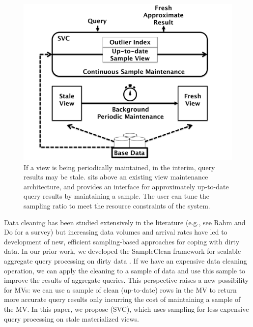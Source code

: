 \begin{figure}[t] \vspace{-2em}
\centering
 \includegraphics[scale=0.25]{figs/sys-arch.pdf} \vspace{-.25em}
 \caption{If a view is being periodically maintained, in the interim, query results may be stale. \svcfull sits above an existing view maintenance architecture, and provides an interface for approximately up-to-date query results by maintaining a sample. The user can tune the sampling ratio to meet the resource constraints of the system.\label{sys-arch}}\vspace{-1.75em}
\end{figure}

Data cleaning has been studied extensively in the literature (e.g., see Rahm and Do for a survey\cite{rahm2000data}) but increasing data volumes and arrival rates have led to development of new, efficient sampling-based approaches for coping with dirty data.   
In our prior work, we developed the SampleClean framework for scalable aggregate query processing on dirty data \cite{wang1999sample}.
If we have an expensive data cleaning operation, we can apply the cleaning to a sample of data and use this sample to improve the results of aggregate queries.
This perspective raises a new possibility for MVs: we can use a sample of clean (up-to-date) rows in the MV to return more accurate query results only incurring the cost of maintaining a sample of the MV.
In this paper, we propose \svcfull (SVC), which uses sampling for less expensive query processing on stale materialized views.



